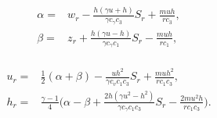 \documentclass[10pt,a4paper]{amsart}
\newcommand{\fr}{\frac}
\begin{document}
\begin{align}\label{2.12}
\begin{split}
\alpha=&w_r-\fr{h(\gamma u+h)}{\gamma c_\gamma c_3}S_r +\fr{m uh}{rc_3}, \\
\beta=&z_r+\fr{h(\gamma u-h)}{\gamma c_\gamma c_1}S_r-\fr{m uh}{rc_1},
\end{split}
\end{align}

\begin{align}\label{2.13}
\begin{split}
u_r=&\fr{1}{2}(\alpha+\beta)-\fr{uh^2}{\gamma c_v c_1c_3}S_r +\fr{muh^2}{rc_1c_3}, \\
h_r=&\fr{\gamma-1}{4}\bigg(\alpha-\beta+\frac{2h(\gamma u^2-h^2)}{\gamma c_\gamma c_1c_3}S_r-\frac{2m u^2h}{rc_1c_3}\bigg).
\end{split}
\end{align}
\end{document}
